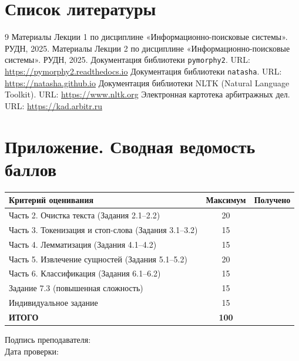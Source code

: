 \documentclass[12pt, a4paper]{report}
\begin{document}
\chapter*{Список литературы}

\begin{thebibliography}{9}
    Материалы Лекции 1 по дисциплине «Информационно-поисковые системы».
    РУДН, 2025.
    Материалы Лекции 2 по дисциплине «Информационно-поисковые системы».
    РУДН, 2025.
    Документация библиотеки \texttt{pymorphy2}.
    URL: \url{https://pymorphy2.readthedocs.io}
    Документация библиотеки \texttt{natasha}.
    URL: \url{https://natasha.github.io}
    Документация библиотеки NLTK (Natural Language Toolkit).
    URL: \url{https://www.nltk.org}
    Электронная картотека арбитражных дел.
    URL: \url{https://kad.arbitr.ru}
\end{thebibliography}

\chapter*{Приложение. Сводная ведомость баллов}
\thispagestyle{plain}

\begin{tcolorbox}[infobox, title={Заполняется преподавателем}]
  \begin{tabularx}{\linewidth}{X c c}
    \toprule
    \rowcolor{LightBlue}
    \textsf{\textbf{Критерий оценивания}} &
    \textsf{\textbf{Максимум}} &
    \textsf{\textbf{Получено}} \\
    \midrule
    Часть 2. Очистка текста (Задания 2.1–2.2)          & 20 & \\
    Часть 3. Токенизация и стоп-слова (Задания 3.1–3.2) & 15 & \\
    Часть 4. Лемматизация (Задания 4.1–4.2)             & 15 & \\
    Часть 5. Извлечение сущностей (Задания 5.1–5.2)     & 20 & \\
    Часть 6. Классификация (Задания 6.1–6.2)            & 15 & \\
    Задание 7.3 (повышенная сложность)                  & 15 & \\
    Индивидуальное задание                              & 15 & \\
    \midrule
    \textbf{ИТОГО}                                      & \textbf{100} & \\
    \bottomrule
  \end{tabularx}
\end{tcolorbox}

\vspace{24pt}
\noindent Подпись преподавателя: \underline{\hspace{6cm}}
\\[12pt]
\noindent Дата проверки: \underline{\hspace{4cm}}
\end{document}

